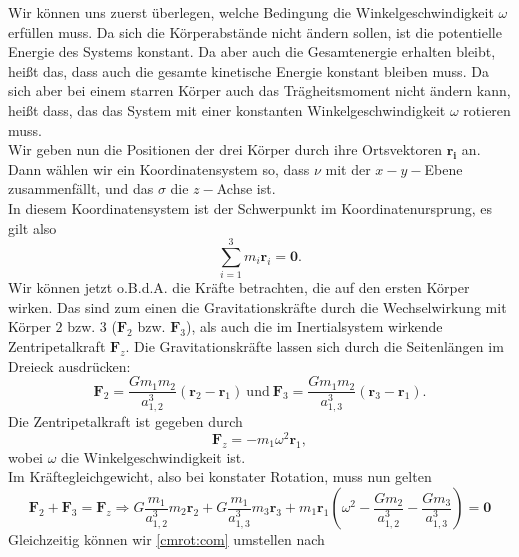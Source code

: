 \begin{Answer}[ref = cmrot]
	Wir können uns zuerst überlegen, welche Bedingung die Winkelgeschwindigkeit $\omega$ erfüllen muss. Da sich die Körperabstände nicht ändern sollen, ist die potentielle Energie des Systems konstant. Da aber auch die Gesamtenergie erhalten bleibt, heißt das, dass auch die gesamte kinetische Energie konstant bleiben muss. Da sich aber bei einem starren Körper auch das Trägheitsmoment nicht ändern kann, heißt dass, das das System mit einer konstanten Winkelgeschwindigkeit $\omega$ rotieren muss.\\
	Wir geben nun die Positionen der drei Körper durch ihre Ortsvektoren $\mathbf{r_i}$ an. Dann wählen wir ein Koordinatensystem so, dass $\nu$ mit der $x-y-$Ebene zusammenfällt, und das $\sigma$ die $z-$Achse ist.\\
	In diesem Koordinatensystem ist der Schwerpunkt im Koordinatenursprung, es gilt also
	\begin{equation}\label{cmrot:com}
		\sum_{i=1}^{3} m_i\mathbf{r}_i = \mathbf{0}.
	\end{equation}
	Wir können jetzt o.B.d.A. die Kräfte betrachten, die auf den ersten Körper wirken. Das sind zum einen die Gravitationskräfte durch die Wechselwirkung mit Körper $2$ bzw. $3$ ($\mathbf{F}_{2}$ bzw. $\mathbf{F}_{3}$), als auch die im Inertialsystem wirkende Zentripetalkraft $\mathbf{F}_{z}$. Die Gravitationskräfte lassen sich durch die Seitenlängen im Dreieck ausdrücken:
	\begin{equation}\label{cmrot:grav}
		\mathbf{F}_2 = \frac{Gm_1m_2}{a_{1,2}^3}\left(\mathbf{r}_2-\mathbf{r}_1\right)~\mathrm{und}~\mathbf{F}_3 = \frac{Gm_1m_2}{a_{1,3}^3}\left(\mathbf{r}_3-\mathbf{r}_1\right).
	\end{equation}
	Die Zentripetalkraft ist gegeben durch
	\begin{equation}\label{cmrot:rot}
		\mathbf{F}_z = -m_1 \omega^2 \mathbf{r}_1,
	\end{equation}
	wobei $\omega$ die Winkelgeschwindigkeit ist.\\
	Im Kräftegleichgewicht, also bei konstater Rotation, muss nun gelten
	\begin{equation}\label{cmrot:fbal}
		\mathbf{F}_2 + \mathbf{F}_3 = \mathbf{F}_{z} \Rightarrow G \frac{m_1}{a_{1,2}^3} m_2 \mathbf{r}_2 + G \frac{m_1}{a_{1,3}^3}m_3\mathbf{r}_{3} + m_1 \mathbf{r}_1 \left(\omega^2 - \frac{Gm_2}{a_{1,2}^3} - \frac{Gm_3}{a_{1,3}^3}\right) = \mathbf{0}
	\end{equation}
	Gleichzeitig können wir \eqref{cmrot:com} umstellen nach

\end{Answer}
